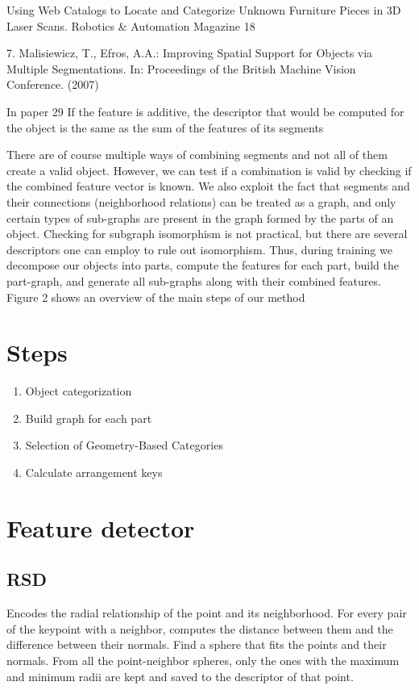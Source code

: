\documentclass[runningheads,a4paper]{llncs}
\begin{document}
{ Using Web Catalogs to Locate and Categorize Unknown Furniture Pieces in 3D
Laser Scans.  Robotics & Automation Magazine
18

7.  Malisiewicz, T., Efros, A.A.:  Improving Spatial Support for Objects via Multiple
Segmentations.  In: Proceedings of the British Machine Vision Conference. (2007)


In paper 29
If the feature is additive, the descriptor that would be computed for the object is
the same as the sum of the features of its segments

There are of course multiple ways of combining segments and not all of them
create a valid object. However, we can test if a combination is valid by checking if
the combined feature vector is known. We also exploit the fact that segments and
their connections (neighborhood relations) can be treated as a graph, and only
certain types of sub-graphs are present in the graph formed by the parts of an
object. Checking for subgraph isomorphism is not practical, but there are several
descriptors one can employ to rule out isomorphism. Thus, during training we
decompose  our  objects  into  parts,  compute  the  features  for  each  part,  build
the part-graph, and generate all sub-graphs along with their combined features.
Figure 2 shows an overview of the main steps of our method

\section{Steps}
\begin{enumerate}
    \item Object categorization
    \item Build graph for each part
    \item Selection of Geometry-Based Categories
    \item Calculate arrangement keys
\end{enumerate}

\section{Feature detector}


\subsection{RSD}
Encodes the radial relationship of the point and its neighborhood. 
For every pair of the keypoint with a neighbor, computes the distance between them and the difference between their normals. 
Find a sphere that fits the points and their normals.
From all the point-neighbor spheres, only the ones with the maximum and minimum radii are kept and saved to the descriptor of that point. 

}
\end{document}
